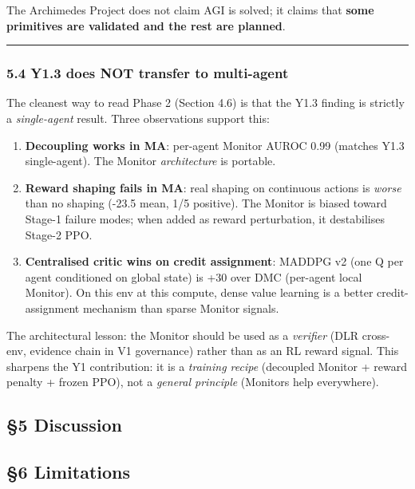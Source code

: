 \documentclass[
]{article}
\providecommand{\tightlist}{%
  \setlength{\itemsep}{0pt}\setlength{\parskip}{0pt}}
\begin{document}
The Archimedes Project does not claim AGI is solved; it claims that
\textbf{some primitives are validated and the rest are planned}.

\begin{center}\rule{0.5\linewidth}{0.5pt}\end{center}

\subsubsection{5.4 Y1.3 does NOT transfer to
multi-agent}\label{y1.3-does-not-transfer-to-multi-agent}

The cleanest way to read Phase 2 (Section 4.6) is that the Y1.3 finding
is strictly a \emph{single-agent} result. Three observations support
this:

\begin{enumerate}
\def\labelenumi{\arabic{enumi}.}
\tightlist
\item
  \textbf{Decoupling works in MA}: per-agent Monitor AUROC 0.99 (matches
  Y1.3 single-agent). The Monitor \emph{architecture} is portable.
\item
  \textbf{Reward shaping fails in MA}: real shaping on continuous
  actions is \emph{worse} than no shaping (-23.5 mean, 1/5 positive).
  The Monitor is biased toward Stage-1 failure modes; when added as
  reward perturbation, it destabilises Stage-2 PPO.
\item
  \textbf{Centralised critic wins on credit assignment}: MADDPG v2 (one
  Q per agent conditioned on global state) is +30 over DMC (per-agent
  local Monitor). On this env at this compute, dense value learning is a
  better credit-assignment mechanism than sparse Monitor signals.
\end{enumerate}

The architectural lesson: the Monitor should be used as a
\emph{verifier} (DLR cross-env, evidence chain in V1 governance) rather
than as an RL reward signal. This sharpens the Y1 contribution: it is a
\emph{training recipe} (decoupled Monitor + reward penalty + frozen
PPO), not a \emph{general principle} (Monitors help everywhere).

\subsection{§5 Discussion}\label{discussion}

\subsection{§6 Limitations}\label{limitations}
\end{document}
